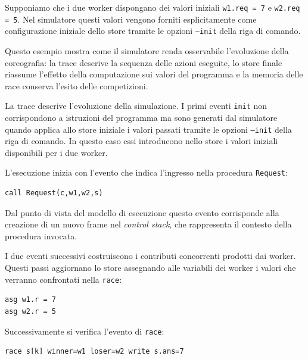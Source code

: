Supponiamo che i due worker dispongano dei valori iniziali \texttt{w1.req = 7} e \texttt{w2.req = 5}. Nel simulatore questi valori vengono forniti esplicitamente come configurazione iniziale dello store tramite le opzioni \texttt{--init} della riga di comando.

Questo esempio mostra come il simulatore renda osservabile l’evoluzione della coreografia: la trace descrive la sequenza delle azioni eseguite, lo store finale riassume l’effetto della computazione sui valori del programma e la memoria delle race conserva l’esito delle competizioni.

La trace descrive l’evoluzione della simulazione. I primi eventi \texttt{init} non corrispondono a istruzioni del programma ma sono generati dal simulatore quando applica allo store iniziale i valori passati tramite le opzioni \texttt{--init} della riga di comando. In questo caso essi introducono nello store i valori iniziali disponibili per i due worker.

L’esecuzione inizia con l’evento che indica l’ingresso nella procedura \texttt{Request}:

\begin{tcolorbox}[colback=black!2,colframe=black!35,boxrule=0.4pt]
\begin{verbatim}
call Request(c,w1,w2,s)
\end{verbatim}
\end{tcolorbox}

Dal punto di vista del modello di esecuzione questo evento corrisponde alla creazione di un nuovo frame nel \textit{control stack}, che rappresenta il contesto della procedura invocata.

I due eventi successivi costruiscono i contributi concorrenti prodotti dai worker. Questi passi aggiornano lo store assegnando alle variabili dei worker i valori che verranno confrontati nella \texttt{race}:

\begin{tcolorbox}[colback=black!2,colframe=black!35,boxrule=0.4pt]
\begin{verbatim}
asg w1.r = 7
asg w2.r = 5
\end{verbatim}
\end{tcolorbox}

Successivamente si verifica l’evento di \texttt{race}:

\begin{tcolorbox}[colback=black!2,colframe=black!35,boxrule=0.4pt]
\begin{verbatim}
race s[k] winner=w1 loser=w2 write s.ans=7
\end{verbatim}
\end{tcolorbox}

